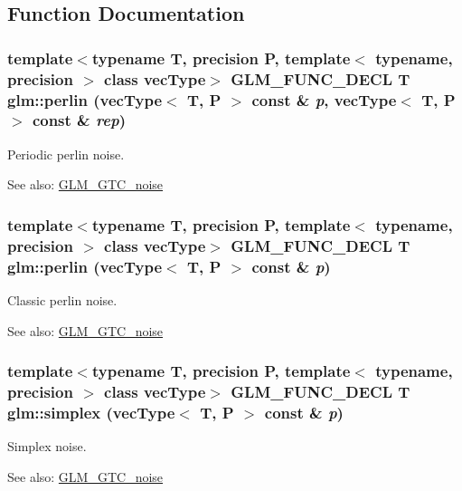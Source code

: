 \subsection{Function Documentation}
\hypertarget{group__gtc__noise_gfdb3eb82b2d5a45159a6425acd6ff398}{
\subsubsection[perlin]{\setlength{\rightskip}{0pt plus 5cm}template$<$typename T, precision P, template$<$ typename, precision $>$ class vecType$>$ GLM\_\-FUNC\_\-DECL T glm::perlin (vecType$<$ T, P $>$ const \& {\em p}, \/  vecType$<$ T, P $>$ const \& {\em rep})}}
\label{group__gtc__noise_gfdb3eb82b2d5a45159a6425acd6ff398}


Periodic perlin noise. \begin{Desc}
\item[See also:]\hyperlink{group__gtc__noise}{GLM\_\-GTC\_\-noise} \end{Desc}
\hypertarget{group__gtc__noise_g81bdad1f7221a08af5ea462c98f692f7}{
\subsubsection[perlin]{\setlength{\rightskip}{0pt plus 5cm}template$<$typename T, precision P, template$<$ typename, precision $>$ class vecType$>$ GLM\_\-FUNC\_\-DECL T glm::perlin (vecType$<$ T, P $>$ const \& {\em p})}}
\label{group__gtc__noise_g81bdad1f7221a08af5ea462c98f692f7}


Classic perlin noise. \begin{Desc}
\item[See also:]\hyperlink{group__gtc__noise}{GLM\_\-GTC\_\-noise} \end{Desc}
\hypertarget{group__gtc__noise_g2c46feb8914501452e6bcdc04f33a0b2}{
\subsubsection[simplex]{\setlength{\rightskip}{0pt plus 5cm}template$<$typename T, precision P, template$<$ typename, precision $>$ class vecType$>$ GLM\_\-FUNC\_\-DECL T glm::simplex (vecType$<$ T, P $>$ const \& {\em p})}}
\label{group__gtc__noise_g2c46feb8914501452e6bcdc04f33a0b2}


Simplex noise. \begin{Desc}
\item[See also:]\hyperlink{group__gtc__noise}{GLM\_\-GTC\_\-noise} \end{Desc}
